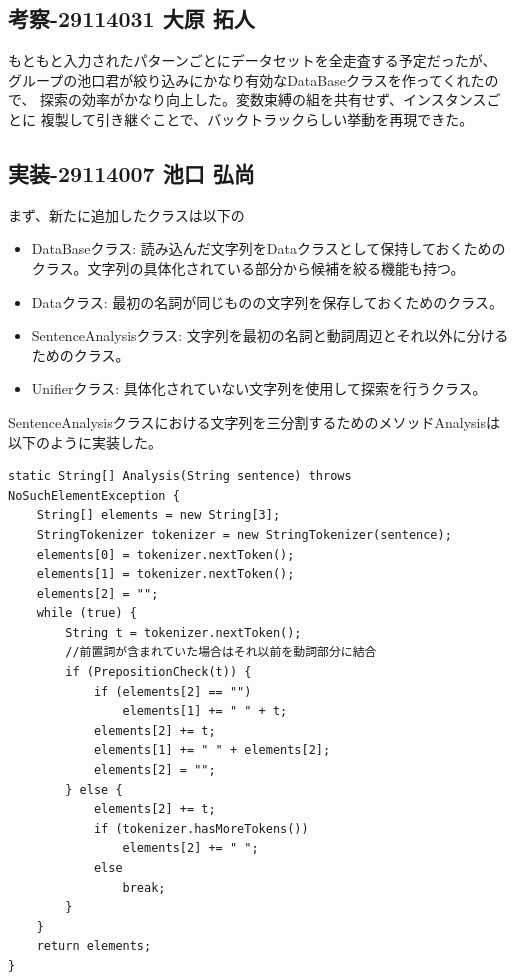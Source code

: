\documentclass{jarticle}
\begin{document}
\subsection{考察-29114031 大原 拓人}
もともと入力されたパターンごとにデータセットを全走査する予定だったが、
グループの池口君が絞り込みにかなり有効なDataBaseクラスを作ってくれたので、
探索の効率がかなり向上した。変数束縛の組を共有せず、インスタンスごとに
複製して引き継ぐことで、バックトラックらしい挙動を再現できた。

\subsection{実装-29114007 池口 弘尚}
まず、新たに追加したクラスは以下の
\begin{itemize}
\item DataBaseクラス: 読み込んだ文字列をDataクラスとして保持しておくためのクラス。文字列の具体化されている部分から候補を絞る機能も持つ。
\item Dataクラス: 最初の名詞が同じものの文字列を保存しておくためのクラス。
\item SentenceAnalysisクラス: 文字列を最初の名詞と動詞周辺とそれ以外に分けるためのクラス。
\item Unifierクラス: 具体化されていない文字列を使用して探索を行うクラス。
\end{itemize}

SentenceAnalysisクラスにおける文字列を三分割するためのメソッドAnalysisは以下のように実装した。

\begin{lstlisting}[caption=SentenceAnalysisのAnalysis,label=src:Analysis]
static String[] Analysis(String sentence) throws NoSuchElementException {
	String[] elements = new String[3];
	StringTokenizer tokenizer = new StringTokenizer(sentence);
	elements[0] = tokenizer.nextToken();
	elements[1] = tokenizer.nextToken();
	elements[2] = "";
	while (true) {
		String t = tokenizer.nextToken();
        //前置詞が含まれていた場合はそれ以前を動詞部分に結合
		if (PrepositionCheck(t)) {
			if (elements[2] == "")
				elements[1] += " " + t;
			elements[2] += t;
			elements[1] += " " + elements[2];
			elements[2] = "";
		} else {
			elements[2] += t;
			if (tokenizer.hasMoreTokens())
				elements[2] += " ";
			else
				break;
		}
	}
	return elements;
}
\end{lstlisting}
\end{document}

